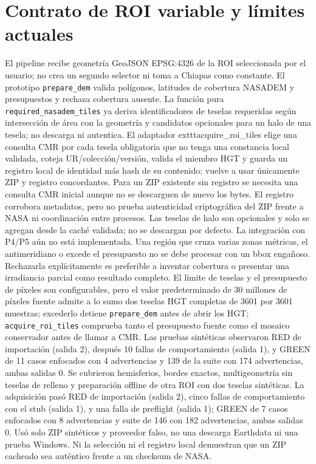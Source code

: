 \documentclass[11pt,a4paper]{article}
\begin{document}
\section{Contrato de ROI variable y límites actuales}
El pipeline recibe geometría GeoJSON EPSG:4326 de la ROI seleccionada por el usuario; no crea un segundo selector ni toma a Chiapas como constante. El prototipo \texttt{prepare\_dem} valida polígonos, latitudes de cobertura NASADEM y presupuestos y rechaza cobertura ausente. La función pura \texttt{required\_nasadem\_tiles} ya deriva identificadores de teselas requeridas según intersección de área con la geometría y candidatos opcionales para un halo de una tesela; no descarga ni autentica. El adaptador 	exttt{acquire\_roi\_tiles} elige una consulta CMR por cada tesela obligatoria que no tenga una constancia local validada, coteja UR/colección/versión, valida el miembro HGT y guarda un registro local de identidad más hash de su contenido; vuelve a usar únicamente ZIP y registro concordantes. Para un ZIP existente sin registro se necesita una consulta CMR inicial aunque no se descarguen de nuevo los bytes. El registro corrobora metadatos, pero no prueba autenticidad criptográfica del ZIP frente a NASA ni coordinación entre procesos. Las teselas de halo son opcionales y solo se agregan desde la caché validada; no se descargan por defecto. La integración con P4/P5 aún no está implementada. Una región que cruza varias zonas métricas, el antimeridiano o excede el presupuesto no se debe procesar con un bbox engañoso. Rechazarla explícitamente es preferible a inventar cobertura o presentar una irradiancia parcial como resultado completo. El límite de teselas y el presupuesto de píxeles son configurables, pero el valor predeterminado de 30 millones de píxeles fuente admite a lo sumo dos teselas HGT completas de 3601 por 3601 muestras; excederlo detiene \texttt{prepare\_dem} antes de abrir los HGT; \texttt{acquire\_roi\_tiles} comprueba tanto el presupuesto fuente como el mosaico conservador antes de llamar a CMR. Las pruebas sintéticas observaron RED de importación (salida 2), después 10 fallas de comportamiento (salida 1), y GREEN de 11 casos enfocados con 4 advertencias y 139 de la suite con 174 advertencias, ambas salidas 0. Se cubrieron hemisferios, bordes exactos, multigeometría sin teselas de relleno y preparación offline de otra ROI con dos teselas sintéticas. La adquisición pasó RED de importación (salida 2), cinco fallas de comportamiento con el stub (salida 1), y una falla de preflight (salida 1); GREEN de 7 casos enfocados con 8 advertencias y suite de 146 con 182 advertencias, ambas salidas 0. Usó solo ZIP sintéticos y proveedor falso, no una descarga Earthdata ni una prueba Windows. Ni la selección ni el registro local demuestran que un ZIP cacheado sea auténtico frente a un checksum de NASA.
\end{document}
